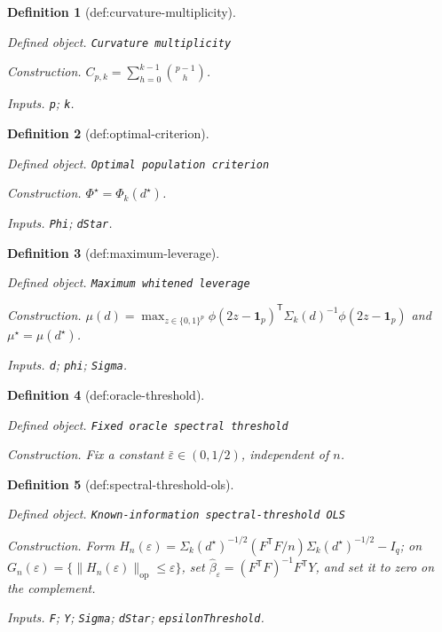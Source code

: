 \documentclass{article}
\newtheorem{definition}{Definition}
\begin{document}
\begin{definition}[def:curvature-multiplicity]\label{def:curvature-multiplicity}
\par\smallskip\noindent\emph{Defined object.} \texttt{Curvature multiplicity}
\par\smallskip\noindent\emph{Construction.} \(C_{p,k}=\sum_{h=0}^{k-1}\binom{p-1}{h}\).
\par\smallskip\noindent\emph{Inputs.} \texttt{p}; \texttt{k}.
\end{definition}

\begin{definition}[def:optimal-criterion]\label{def:optimal-criterion}
\par\smallskip\noindent\emph{Defined object.} \texttt{Optimal population criterion}
\par\smallskip\noindent\emph{Construction.} \(\Phi^\star=\Phi_k(d^\star)\).
\par\smallskip\noindent\emph{Inputs.} \texttt{Phi}; \texttt{dStar}.
\end{definition}

\begin{definition}[def:maximum-leverage]\label{def:maximum-leverage}
\par\smallskip\noindent\emph{Defined object.} \texttt{Maximum whitened leverage}
\par\smallskip\noindent\emph{Construction.} \(\mu(d)=\max_{z\in\{0,1\}^p}\phi(2z-\mathbf 1_p)^{\mathsf T}\Sigma_k(d)^{-1}\phi(2z-\mathbf 1_p)\) and \(\mu^\star=\mu(d^\star)\).
\par\smallskip\noindent\emph{Inputs.} \texttt{d}; \texttt{phi}; \texttt{Sigma}.
\end{definition}

\begin{definition}[def:oracle-threshold]\label{def:oracle-threshold}
\par\smallskip\noindent\emph{Defined object.} \texttt{Fixed oracle spectral threshold}
\par\smallskip\noindent\emph{Construction.} Fix a constant \(\bar\varepsilon\in(0,1/2)\), independent of \(n\).
\end{definition}

\begin{definition}[def:spectral-threshold-ols]\label{def:spectral-threshold-ols}
\par\smallskip\noindent\emph{Defined object.} \texttt{Known-\allowbreak{}information spectral-\allowbreak{}threshold OLS}
\par\smallskip\noindent\emph{Construction.} Form \(H_n(\varepsilon)=\Sigma_k(d^\star)^{-1/2}(F^{\mathsf T}F/n)\Sigma_k(d^\star)^{-1/2}-I_q\); on \(G_n(\varepsilon)=\{\|H_n(\varepsilon)\|_{\mathrm{op}}\le\varepsilon\}\), set \(\widehat\beta_{\varepsilon}=(F^{\mathsf T}F)^{-1}F^{\mathsf T}Y\), and set it to zero on the complement.
\par\smallskip\noindent\emph{Inputs.} \texttt{F}; \texttt{Y}; \texttt{Sigma}; \texttt{dStar}; \texttt{epsilonThreshold}.
\end{definition}
\end{document}
